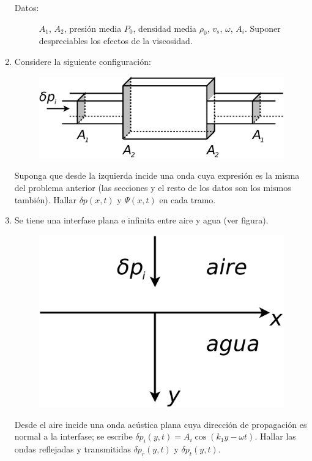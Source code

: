 \documentclass[11pt,spanish,a4paper]{article}
\begin{document}
\begin{enumerate}
\begin{description}
\item [{Datos:}] $A_{1}$, $A_{2}$, presión media $P_{0}$, densidad media
$\rho_{0}$, $v_{s}$, $\omega$, $A_{i}$. Suponer despreciables
los efectos de la viscosidad.
\end{description}
\item Considere la siguiente configuración:
\begin{figure}[H]
\centering{}\includegraphics[clip,scale=0.25]{ej2-11}
\end{figure}
Suponga que desde la izquierda incide una onda cuya expresión es la
misma del problema anterior (las secciones y el resto de los datos
son los mismos también). Hallar $\delta p(x,t)$ y $\Psi(x,t)$ en
cada tramo.
\item Se tiene una interfase plana e infinita entre aire y agua (ver figura).
\begin{figure}[H]
\centering{}\includegraphics[clip,scale=0.25]{ej2-12}
\end{figure}
Desde el aire incide una onda acústica plana cuya dirección de propagación
es normal a la interfase; se escribe $\delta p_{i}(y,t)=A_{i}\cos\left(k_{1}y-\omega t\right)$.
Hallar las ondas reflejadas y transmitidas $\delta p_{r}(y,t)$ y
$\delta p_{t}(y,t)$.



\end{enumerate}
\end{document}
